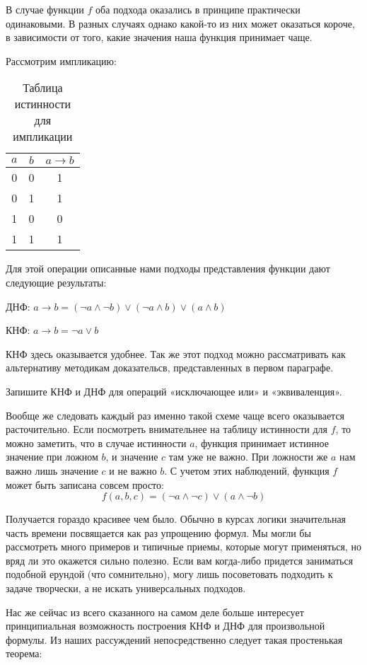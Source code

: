 В случае функции $f$ оба подхода оказались в принципе практически одинаковыми. В разных случаях однако какой-то из них может оказаться короче, в зависимости от того, какие значения наша функция принимает чаще.

Рассмотрим импликацию:

\begin{table}[h]
\centering
\begin{tabular}{cc|c}
$a$&$b$&$a\rightarrow b$\\
\hline
0&0&1 \\
0&1&1 \\
1&0&0 \\
1&1&1
\end{tabular}
\caption{Таблица истинности для импликации}
\end{table}

Для этой операции описанные нами подходы представления функции дают следующие результаты:

ДНФ: $a \rightarrow b = (\neg a\land \neg b)\lor(\neg a \land b)\lor(a\land b)$

КНФ: $a\rightarrow b = \neg a \lor b$

КНФ здесь оказывается удобнее. Так же этот подход можно рассматривать как альтернативу методикам доказательсв, представленных в первом параграфе.

\begin{exercise} Запишите КНФ и ДНФ для операций «исключающее или» и «эквиваленция».\end{exercise}

Вообще же следовать каждый раз именно такой схеме чаще всего оказывается расточительно. Если посмотреть внимательнее на таблицу истинности для $f$, то можно заметить, что в случае истинности $a$, функция принимает истинное значение при ложном $b$, и значение $c$ там уже не важно. При ложности же $a$ нам важно лишь значение $c$ и не важно $b$. С учетом этих наблюдений, функция $f$ может быть записана совсем просто: $$f(a, b, c) = (\neg a\land \neg c) \lor (a \land \neg b)$$

Получается гораздо красивее чем было. Обычно в курсах логики значительная часть времени посвящается как раз упрощению формул. Мы могли бы рассмотреть много примеров и типичные приемы, которые могут применяться, но вряд ли это окажется сильно полезно. Если вам когда-либо придется заниматься подобной ерундой (что сомнительно), могу лишь посоветовать подходить к задаче творчески, а не искать универсальных подходов.

Нас же сейчас из всего сказанного на самом деле больше интересует принципиальная возможность построения КНФ и ДНФ для произвольной формулы. Из наших рассуждений непосредственно следует такая простенькая теорема:

